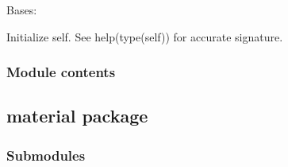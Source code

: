 \documentclass[letterpaper,10pt,english]{sphinxmanual}
\begin{document}
\begin{fulllineitems}
\label{\detokenize{annealer:annealer.constantStep.ConstantStep}}
Bases: {\hyperref[\detokenize{annealer:annealer.annealer.Annealer}]{}}

\begin{fulllineitems}
\label{\detokenize{annealer:annealer.constantStep.ConstantStep.__init__}}
Initialize self.  See help(type(self)) for accurate signature.

\end{fulllineitems}


\begin{fulllineitems}
\label{\detokenize{annealer:annealer.constantStep.ConstantStep.stepper}}
\end{fulllineitems}


\end{fulllineitems}



\subsubsection{Module contents}
\label{\detokenize{annealer:module-annealer}}\label{\detokenize{annealer:module-contents}}

\subsection{material package}
\label{\detokenize{material:material-package}}\label{\detokenize{material::doc}}

\subsubsection{Submodules}
\label{\detokenize{material:submodules}}
\end{document}
